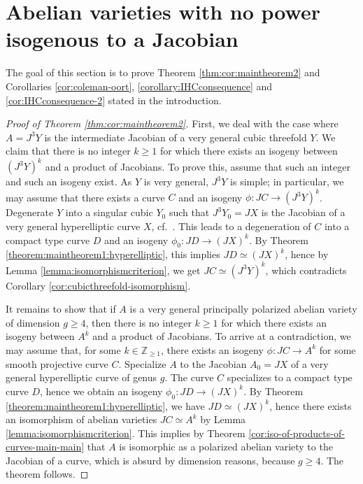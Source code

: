 \documentclass[a4paper,11pt,reqno]{amsart}
\numberwithin{equation}{section}
\theoremstyle{plain}
\theoremstyle{definition}
\newcommand{\Z}{\mathbb Z}
\renewcommand{\cong}{\simeq}
\begin{document}
\section{Abelian varieties with no power isogenous to a Jacobian} \label{section:maintheorem2:IHCapplication}
The goal of this section is to prove Theorem \ref{thm:cor:maintheorem2} and Corollaries \ref{cor:coleman-oort},  \ref{corollary:IHCconsequence} and \ref{cor:IHCconsequence-2} stated in the introduction.  

\begin{proof}[Proof of Theorem \ref{thm:cor:maintheorem2}] 

First, we deal with the case where $A = J^3Y$ is the intermediate Jacobian of a very general cubic threefold $Y$. We claim that there is no integer $k \geq 1$ for which there exists an isogeny between $(J^3Y)^k$ and a product of Jacobians. To prove this, assume that such an integer and such an isogeny exist. As $Y$ is very general, $J^3Y$ is simple; in particular, we may assume that there exists a curve $C$ and an isogeny $\phi \colon JC \to (J^3Y)^k$. 
Degenerate $Y$ into a singular cubic $Y_0$ such that $J^3Y_0 = JX$ is the Jacobian of a very general hyperelliptic curve $X$, cf.\ \cite{collino-fanofundamentalgroup}. This leads to a degeneration of $C$ into a compact type curve $D$ and an isogeny $\phi_0 \colon JD \to (JX)^k$. By Theorem \ref{theorem:maintheorem1:hyperelliptic}, this implies 
$JD \cong (JX)^k$, hence by Lemma \ref{lemma:isomorphismcriterion}, we get $JC \cong (J^3Y)^k$, which contradicts Corollary \ref{cor:cubicthreefold-isomorphism}. 

It remains to show that if $A$ is a very general principally polarized abelian variety of dimension $g \geq 4$, then there is no integer $k \geq 1$ for which there exists an isogeny between $A^k$ and a product of Jacobians. To arrive at a contradiction, we may assume that, for some $k \in \Z_{\geq 1}$, there exists an isogeny $\phi \colon JC \to A^k$ for some smooth projective curve $C$. Specialize $A$ to the Jacobian $A_0 = JX$ of a very general hyperelliptic curve of genus $g$. The curve $C$ specializes to a compact type curve $D$, hence we obtain an isogeny $\phi_0 \colon JD  \to (JX)^k$. 
By Theorem \ref{theorem:maintheorem1:hyperelliptic}, we have $JD \cong (JX)^k$, 
hence there exists an isomorphism of abelian varieties $JC \cong A^k$ by Lemma \ref{lemma:isomorphismcriterion}. 
This implies by Theorem \ref{cor:iso-of-products-of-curves-main-main} that $A$ is isomorphic as a polarized abelian variety to the Jacobian of a curve, which is absurd by dimension reasons, because $g\geq 4$. The theorem follows.  
\end{proof}
\end{document}
